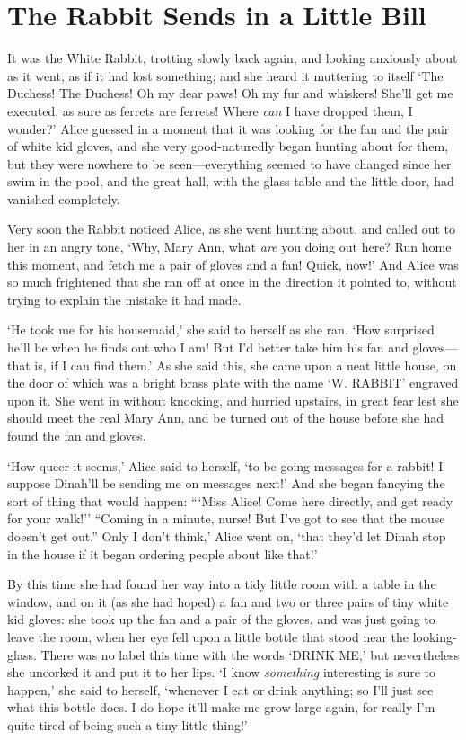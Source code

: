 \documentclass[12pt,openany]{memoir}
\begin{document}
\chapter{The Rabbit Sends in a Little Bill}

It was the White Rabbit, trotting slowly back again, and looking anxiously about as it went, as if it had lost something; and she heard it muttering to itself `The Duchess! The Duchess! Oh my dear paws! Oh my fur and whiskers! She'll get me executed, as sure as ferrets are ferrets! Where \textit{can} I have dropped them, I wonder?' Alice guessed in a moment that it was looking for the fan and the pair of white kid gloves, and she very good-naturedly began hunting about for them, but they were nowhere to be seen---everything seemed to have changed since her swim in the pool, and the great hall, with the glass table and the little door, had vanished completely.

Very soon the Rabbit noticed Alice, as she went hunting about, and called out to her in an angry tone, `Why, Mary Ann, what \textit{are} you doing out here? Run home this moment, and fetch me a pair of gloves and a fan! Quick, now!' And Alice was so much frightened that she ran off at once in the direction it pointed to, without trying to explain the mistake it had made.

`He took me for his housemaid,' she said to herself as she ran. `How surprised he'll be when he finds out who I am! But I'd better take him his fan and gloves---that is, if I can find them.' As she said this, she came upon a neat little house, on the door of which was a bright brass plate with the name `W. RABBIT' engraved upon it. She went in without knocking, and hurried upstairs, in great fear lest she should meet the real Mary Ann, and be turned out of the house before she had found the fan and gloves.

`How queer it seems,' Alice said to herself, `to be going messages for a rabbit! I suppose Dinah'll be sending me on messages next!' And she began fancying the sort of thing that would happen: ```Miss Alice! Come here directly, and get ready for your walk!'' ``Coming in a minute, nurse! But I've got to see that the mouse doesn't get out.'' Only I don't think,' Alice went on, `that they'd let Dinah stop in the house if it began ordering people about like that!'

By this time she had found her way into a tidy little room with a table in the window, and on it (as she had hoped) a fan and two or three pairs of tiny white kid gloves: she took up the fan and a pair of the gloves, and was just going to leave the room, when her eye fell upon a little bottle that stood near the looking-glass. There was no label this time with the words `DRINK ME,' but nevertheless she uncorked it and put it to her lips. `I know \textit{something} interesting is sure to happen,' she said to herself, `whenever I eat or drink anything; so I'll just see what this bottle does. I do hope it'll make me grow large again, for really I'm quite tired of being such a tiny little thing!'
\end{document}
